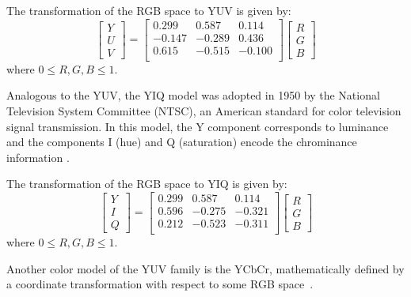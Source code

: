 The transformation of the RGB space to YUV is given by:\\
\begin{equation}
  \begin{bmatrix}
    Y \\ U \\ V
  \end{bmatrix} = 
  \begin{bmatrix}
     0.299 &  0.587 &  0.114 \\
    -0.147 & -0.289 &  0.436 \\
     0.615 & -0.515 & -0.100 \\
  \end{bmatrix}
  \begin{bmatrix}
    R \\ G \\ B
  \end{bmatrix}
\end{equation}
where $0 \leq R, G, B \leq 1$.

Analogous to the YUV, the YIQ model was adopted in 1950 by the National Television System Committee (NTSC), an American standard for color television signal transmission. In this model, the Y component corresponds to luminance and the components I (hue) and Q (saturation) encode the chrominance information \citep{pedrini:08}.

The transformation of the RGB space to YIQ is given by:\\
\begin{equation}
  \begin{bmatrix}
    Y \\ I \\ Q
  \end{bmatrix} = 
  \begin{bmatrix}
    0.299  &  0.587 &  0.114 \\
    0.596  & -0.275 & -0.321 \\
    0.212  & -0.523 & -0.311 \\
  \end{bmatrix}
  \begin{bmatrix}
    R \\ G \\ B
  \end{bmatrix}
\end{equation}
where $0 \leq R, G, B \leq 1$.

Another color model of the YUV family is the YCbCr, mathematically defined by a coordinate transformation with respect to some RGB space~\citep{pedrini:08}.

